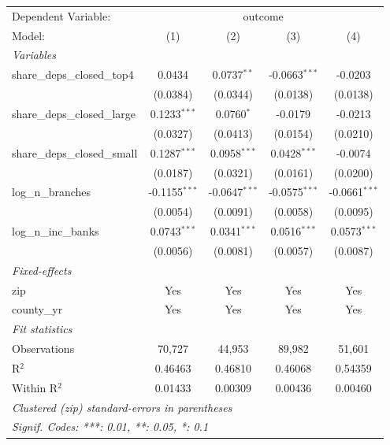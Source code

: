 \begingroup
\centering
\begin{tabular}{lcccc}
   \tabularnewline \midrule \midrule
   Dependent Variable: & \multicolumn{4}{c}{outcome}\\
   Model:                        & (1)             & (2)             & (3)             & (4)\\  
   \midrule
   \emph{Variables}\\
   share\_deps\_closed\_top4     & 0.0434          & 0.0737$^{**}$   & -0.0663$^{***}$ & -0.0203\\   
                                 & (0.0384)        & (0.0344)        & (0.0138)        & (0.0138)\\   
   share\_deps\_closed\_large    & 0.1233$^{***}$  & 0.0760$^{*}$    & -0.0179         & -0.0213\\   
                                 & (0.0327)        & (0.0413)        & (0.0154)        & (0.0210)\\   
   share\_deps\_closed\_small    & 0.1287$^{***}$  & 0.0958$^{***}$  & 0.0428$^{***}$  & -0.0074\\   
                                 & (0.0187)        & (0.0321)        & (0.0161)        & (0.0200)\\   
   log\_n\_branches              & -0.1155$^{***}$ & -0.0647$^{***}$ & -0.0575$^{***}$ & -0.0661$^{***}$\\   
                                 & (0.0054)        & (0.0091)        & (0.0058)        & (0.0095)\\   
   log\_n\_inc\_banks            & 0.0743$^{***}$  & 0.0341$^{***}$  & 0.0516$^{***}$  & 0.0573$^{***}$\\   
                                 & (0.0056)        & (0.0081)        & (0.0057)        & (0.0087)\\   
   \midrule
   \emph{Fixed-effects}\\
   zip                           & Yes             & Yes             & Yes             & Yes\\  
   county\_yr                    & Yes             & Yes             & Yes             & Yes\\  
   \midrule
   \emph{Fit statistics}\\
   Observations                  & 70,727          & 44,953          & 89,982          & 51,601\\  
   R$^2$                         & 0.46463         & 0.46810         & 0.46068         & 0.54359\\  
   Within R$^2$                  & 0.01433         & 0.00309         & 0.00436         & 0.00460\\  
   \midrule \midrule
   \multicolumn{5}{l}{\emph{Clustered (zip) standard-errors in parentheses}}\\
   \multicolumn{5}{l}{\emph{Signif. Codes: ***: 0.01, **: 0.05, *: 0.1}}\\
\end{tabular}
\par\endgroup
